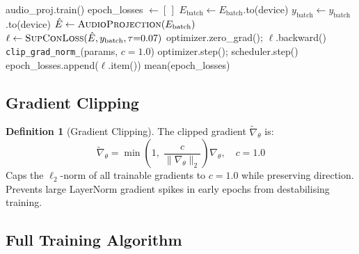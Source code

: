 \documentclass[12pt,a4paper]{article}
\theoremstyle{definition}
\newtheorem{definition}{Definition}[section]
\theoremstyle{plain}
\theoremstyle{remark}
\begin{document}
\begin{algorithm}[H]
\caption{Single SupCon Training Epoch}
\label{alg:train_epoch}
\begin{algorithmic}[1]
\State audio\_proj.train()
\State epoch\_losses $\gets [\,]$
  \State $E_{\text{batch}} \gets E_{\text{batch}}$.to(device) \Comment{$[B,768]$}
  \State $y_{\text{batch}} \gets y_{\text{batch}}$.to(device) \Comment{$[B]$}
  \State $\hat{E} \gets \textsc{AudioProjection}(E_{\text{batch}})$ 
  \State $\ell \gets \textsc{SupConLoss}(\hat{E}, y_{\text{batch}}, \tau{=}0.07)$
  \State optimizer.zero\_grad(); $\ell$.backward()
  \State \texttt{clip\_grad\_norm\_}(params, $c{=}1.0$)
  \State optimizer.step(); scheduler.step()
  \State epoch\_losses.append($\ell$.item())
\EndFor
\State \Return mean(epoch\_losses)
\end{algorithmic}
\end{algorithm}

\subsection{Gradient Clipping}

\begin{definition}[Gradient Clipping]
The clipped gradient $\tilde{\nabla}_\theta$ is:
\[
  \tilde{\nabla}_\theta = \min\!\left(1,\;\frac{c}{\|\nabla_\theta\|_2}\right)\nabla_\theta,
  \quad c = 1.0
\]
Caps the $\ell_2$-norm of all trainable gradients to $c=1.0$ while
preserving direction.  Prevents large LayerNorm gradient spikes in early
epochs from destabilising training.
\end{definition}

\subsection{Full Training Algorithm}
\end{document}
